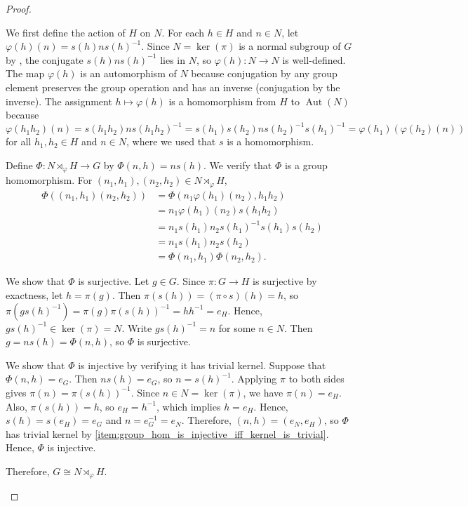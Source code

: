 \begin{proof}
\begin{enumerate}
        We first define the action of $H$ on $N$. For each $h \in H$ and $n \in N$, let $\varphi(h)(n) = s(h)n s(h)^{-1}$. Since $N = \ker(\pi)$ is a normal subgroup of $G$ by , the conjugate $s(h)n s(h)^{-1}$ lies in $N$, so $\varphi(h): N \to N$ is well-defined. The map $\varphi(h)$ is an automorphism of $N$ because conjugation by any group element preserves the group operation and has an inverse (conjugation by the inverse). The assignment $h \mapsto \varphi(h)$ is a homomorphism from $H$ to $\operatorname{Aut}(N)$ because
        $$\varphi(h_1h_2)(n) = s(h_1h_2)n s(h_1h_2)^{-1} = s(h_1)s(h_2) n s(h_2)^{-1}s(h_1)^{-1} = \varphi(h_1)(\varphi(h_2)(n))$$
        for all $h_1, h_2 \in H$ and $n \in N$, where we used that $s$ is a homomorphism.

        Define $\Phi: N \rtimes_\varphi H \to G$ by $\Phi(n, h) = n s(h)$. We verify that $\Phi$ is a group homomorphism. For $(n_1, h_1), (n_2, h_2) \in N \rtimes_\varphi H$,
        \begin{align*}
            \Phi((n_1, h_1)(n_2, h_2)) &= \Phi(n_1\varphi(h_1)(n_2), h_1h_2) \\
            &= n_1\varphi(h_1)(n_2)s(h_1h_2) \\
            &= n_1 s(h_1)n_2s(h_1)^{-1}s(h_1)s(h_2) \\
            &= n_1 s(h_1)n_2 s(h_2) \\
            &= \Phi(n_1, h_1)\Phi(n_2, h_2).
        \end{align*}

        We show that $\Phi$ is surjective. Let $g \in G$. Since $\pi: G \to H$ is surjective by exactness, let $h = \pi(g)$. Then $\pi(s(h)) = (\pi \circ s)(h) = h$, so $\pi(gs(h)^{-1}) = \pi(g)\pi(s(h))^{-1} = hh^{-1} = e_H$. Hence, $gs(h)^{-1} \in \ker(\pi) = N$. Write $gs(h)^{-1} = n$ for some $n \in N$. Then $g = ns(h) = \Phi(n, h)$, so $\Phi$ is surjective.

        We show that $\Phi$ is injective by verifying it has trivial kernel. Suppose that $\Phi(n, h) = e_G$. Then $ns(h) = e_G$, so $n = s(h)^{-1}$. Applying $\pi$ to both sides gives $\pi(n) = \pi(s(h))^{-1}$. Since $n \in N = \ker(\pi)$, we have $\pi(n) = e_H$. Also, $\pi(s(h)) = h$, so $e_H = h^{-1}$, which implies $h = e_H$. Hence, $s(h) = s(e_H) = e_G$ and $n = e_G^{-1} = e_N$. Therefore, $(n, h) = (e_N, e_H)$, so $\Phi$ has trivial kernel by \eqref{item:group_hom_is_injective_iff_kernel_is_trivial}. Hence, $\Phi$ is injective.

        Therefore, $G \cong N \rtimes_\varphi H$.
    \end{enumerate}
\end{proof}
